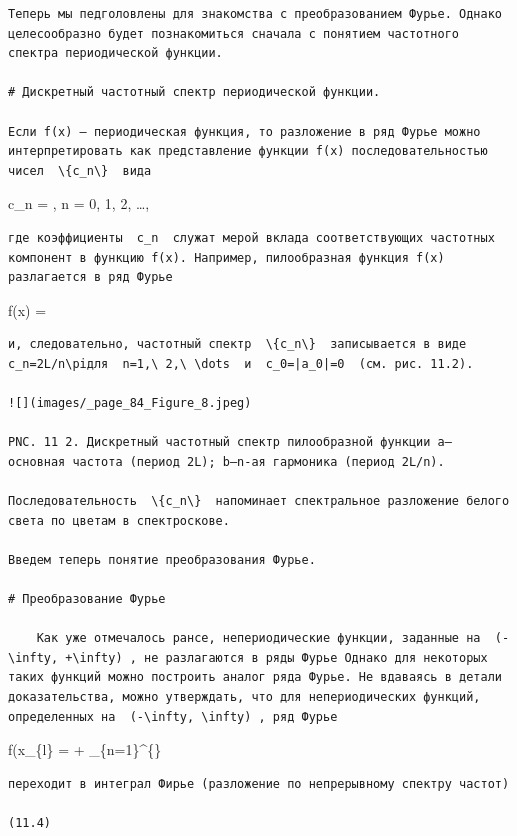 \documentclass[
  ukrainian,
]{article}
\begin{document}
\begin{verbatim}
Теперь мы педголовлены для знакомства с преобразованием Фурье. Однако целесообразно будет познакомиться сначала с понятием частотного спектра периодической функции.

# Дискретный частотный спектр периодической функции.

Если f(x) — периодическая функция, то разложение в ряд Фурье можно интерпретировать как представление функции f(x) последовательностью чисел  \{c_n\}  вида
\end{verbatim}

c\_n = , \quad n = 0, 1, 2, \dots,

\begin{verbatim}
где коэффициенты  c_n  служат мерой вклада соответствующих частотных компонент в функцию f(x). Например, пилообразная функция f(x) разлагается в ряд Фурье
\end{verbatim}

f(x) = 

\begin{verbatim}
и, следовательно, частотный спектр  \{c_n\}  записывается в виде  c_n=2L/n\piдля  n=1,\ 2,\ \dots  и  c_0=|a_0|=0  (см. рис. 11.2).

![](images/_page_84_Figure_8.jpeg)

PNC. 11 2. Дискретный частотный спектр пилообразной функции a— основная частота (период 2L); b—n-ая гармоника (период 2L/n).

Последовательность  \{c_n\}  напоминает спектральное разложение белого света по цветам в спектроскове.

Введем теперь понятие преобразования Фурье.

# Преобразование Фурье

    Как уже отмечалось рансе, непериодические функции, заданные на  (-\infty, +\infty) , не разлагаются в ряды Фурье Однако для некоторых таких функций можно построить аналог ряда Фурье. Не вдаваясь в детали доказательства, можно утверждать, что для непериодических функций, определенных на  (-\infty, \infty) , ряд Фурье
\end{verbatim}

f(x\_\{l\} =  + \sum\_\{n=1\}\^{}\{\infty\}

\begin{verbatim}
переходит в интеграл Фирье (разложение по непрерывному спектру частот)

(11.4)
\end{verbatim}
\end{document}
